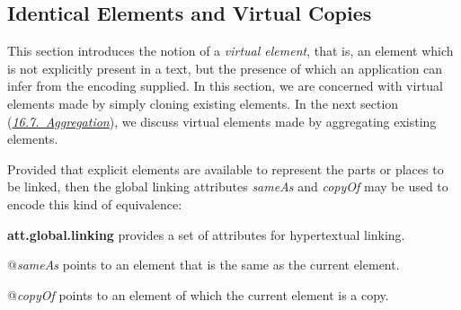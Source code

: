 \subsection[{Identical Elements and Virtual Copies}]{Identical Elements and Virtual Copies}\label{SAIE}\par
This section introduces the notion of a \textit{virtual element}, that is, an element which is not explicitly present in a text, but the presence of which an application can infer from the encoding supplied. In this section, we are concerned with virtual elements made by simply cloning existing elements. In the next section (\textit{\hyperref[SAAG]{16.7.\ Aggregation}}), we discuss virtual elements made by aggregating existing elements.\par
Provided that explicit elements are available to represent the parts or places to be linked, then the global linking attributes {\itshape sameAs} and {\itshape copyOf} may be used to encode this kind of equivalence: 
\begin{sansreflist}
  
\item [\textbf{att.global.linking}] provides a set of attributes for hypertextual linking.\hfil\\[-10pt]\begin{sansreflist}
    \item[@{\itshape sameAs}]
  points to an element that is the same as the current element.
    \item[@{\itshape copyOf}]
  points to an element of which the current element is a copy.
\end{sansreflist}  
\end{sansreflist}
\par

